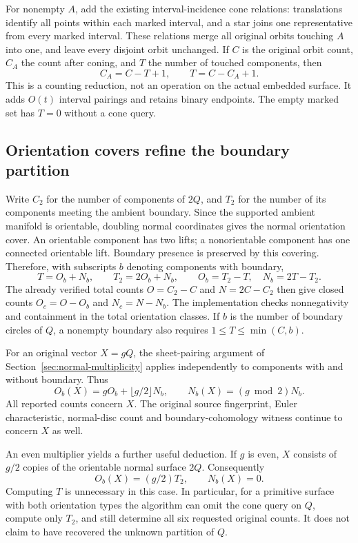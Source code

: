 For nonempty $A$, add the existing interval-incidence cone relations:
translations identify all points within each marked interval, and a star
joins one representative from every marked interval. These relations merge
all original orbits touching $A$ into one, and leave every disjoint orbit
unchanged. If $C$ is the original orbit count, $C_A$ the count after coning,
and $T$ the number of touched components, then
\[
 C_A=C-T+1,\qquad T=C-C_A+1.
\]
This is a counting reduction, not an operation on the actual embedded
surface. It adds $O(t)$ interval pairings and retains binary endpoints.
The empty marked set has $T=0$ without a cone query.

\subsection{Orientation covers refine the boundary partition}

Write $C_2$ for the number of components of $2Q$, and $T_2$ for the number
of its components meeting the ambient boundary. Since the supported
ambient manifold is orientable, doubling normal coordinates gives the
normal orientation cover. An orientable component has two lifts; a
nonorientable component has one connected orientable lift. Boundary
presence is preserved by this covering. Therefore, with subscripts $b$
denoting components with boundary,
\[
 T=O_b+N_b,\qquad T_2=2O_b+N_b,
 \qquad O_b=T_2-T,\quad N_b=2T-T_2.
\]
The already verified total counts $O=C_2-C$ and $N=2C-C_2$ then give
closed counts $O_c=O-O_b$ and $N_c=N-N_b$. The implementation checks
nonnegativity and containment in the total orientation classes. If $b$
is the number of boundary circles of $Q$, a nonempty boundary also
requires $1\le T\le\min(C,b)$.

For an original vector $X=gQ$, the sheet-pairing argument of
Section~\ref{sec:normal-multiplicity} applies independently to components
with and without boundary. Thus
\[
 O_b(X)=gO_b+\lfloor g/2\rfloor N_b,
 \qquad N_b(X)=(g\bmod2)N_b.
\]
All reported counts concern $X$. The original source fingerprint,
Euler characteristic, normal-disc count and boundary-cohomology witness
continue to concern $X$ as well.

An even multiplier yields a further useful deduction. If $g$ is even,
$X$ consists of $g/2$ copies of the orientable normal surface $2Q$.
Consequently
\[
 O_b(X)=(g/2)T_2,\qquad N_b(X)=0.
\]
Computing $T$ is unnecessary in this case. In particular, for a primitive
surface with both orientation types the algorithm can omit the cone query
on $Q$, compute only $T_2$, and still determine all six requested original
counts. It does not claim to have recovered the unknown partition of $Q$.

